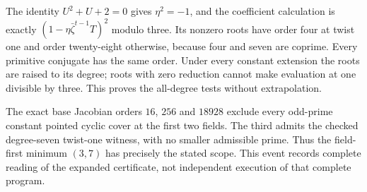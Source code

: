 The identity $U^2+U+2=0$ gives $\eta^2=-1$,
and the coefficient calculation is exactly
$(1-\eta\bar\zeta^{t-1}T)^2$ modulo three.
Its nonzero roots have order four at twist one
and order twenty-eight otherwise, because four
and seven are coprime.  Every primitive conjugate
has the same order.  Under every constant
extension the roots are raised to its degree;
roots with zero reduction cannot make evaluation
at one divisible by three.  This proves the
all-degree tests without extrapolation.

The exact base Jacobian orders $16$, $256$
and $18928$ exclude every odd-prime constant
pointed cyclic cover at the first two fields.
The third admits the checked degree-seven
twist-one witness, with no smaller admissible
prime.  Thus the field-first minimum $(3,7)$
has precisely the stated scope.  This event
records complete reading of the expanded
certificate, not independent execution of
that complete program.
